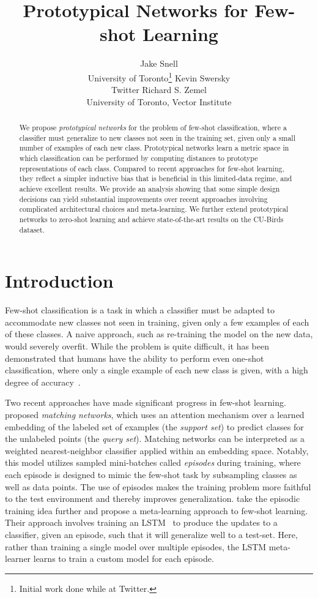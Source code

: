 \documentclass{article}
\title{Prototypical Networks for Few-shot Learning}
\author{
  Jake Snell  \\ University of Toronto\footnote{Initial work done while at Twitter.} \And
  Kevin Swersky \\ Twitter \And
  Richard S. Zemel \\ University of Toronto, Vector Institute
}
\begin{document}
\maketitle

\begin{abstract} 
We propose \emph{prototypical networks} for the problem of few-shot classification, where a classifier must generalize
to new classes not seen in the training set, given only a small number of
examples of each new class. Prototypical networks
learn a metric space in which classification can be performed by computing 
distances to prototype representations of each class. Compared to recent
approaches for few-shot learning, they reflect a simpler
inductive bias that is beneficial in this limited-data regime, and achieve
excellent results. We provide an analysis showing
that some simple design decisions can yield substantial improvements
over recent approaches involving complicated architectural choices and
meta-learning. We further extend prototypical networks
to zero-shot learning and achieve state-of-the-art results
on the CU-Birds dataset.
\end{abstract} 

\section{Introduction}

Few-shot classification \citep{miller2000learning,lake2011one,koch2015siamese} is a task in which a classifier must be adapted to accommodate new classes not seen in training, given only a few examples of each of these classes. A naive approach, such as re-training the model on the new data, would severely overfit. While the problem is quite difficult, it has been demonstrated that humans have the ability to perform even one-shot classification, where only a single example of each new class is given, with a high degree of accuracy~\citep{lake2011one}. 

Two recent approaches have made significant progress in few-shot learning.
\citet{vinyals2016matching} proposed \emph{matching networks}, which uses an attention mechanism over a learned embedding of the labeled set of examples (the \emph{support set}) to predict classes for the unlabeled points (the \emph{query set}). Matching networks can be interpreted as a weighted nearest-neighbor classifier applied within an embedding space. Notably, this model utilizes sampled mini-batches called \emph{episodes} during training, where each episode is designed to mimic the few-shot task by subsampling classes as well as data points. The use of episodes makes the training problem more faithful to the test environment and thereby improves generalization.
\citet{ravi2017meta} take the episodic training idea further and propose a meta-learning approach to few-shot learning. Their approach involves training an LSTM~\cite{hochreiter1997long} to produce the updates to a classifier, given an episode, such that it will generalize well to a test-set. Here, rather than training a single model over multiple episodes, the LSTM meta-learner learns to train a custom model for each episode.
\end{document}
